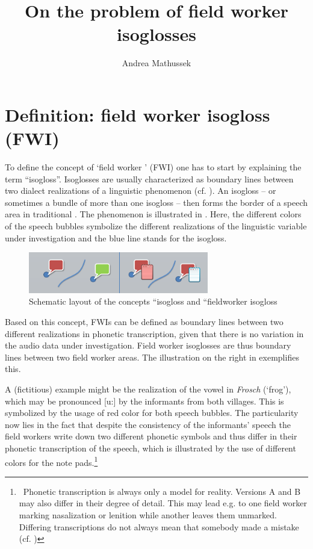 \documentclass[output=paper]{LSP/langsci}
\author{Andrea Mathussek\affiliation{University of Freiburg}}
\title{On the problem of field worker isoglosses}
\begin{document}
\section{Definition: field worker isogloss (FWI)}
To define the concept of `field worker ' (FWI) one has to start by explaining the term ``isogloss''. Isoglosses are usually characterized as boundary lines between two dialect realizations of a linguistic phenomenon (cf. \citealt[296--297]{gluck_metzler_2005}). An isogloss – or sometimes a bundle of more than one isogloss – then forms the border of a speech area in traditional . The phenomenon is illustrated in . Here, the different colors of the speech bubbles symbolize the different realizations of the linguistic variable under investigation and the blue line stands for the isogloss.

\begin{figure}
\includegraphics[width=0.7\textwidth]{illustrations/mathus_fig1}
\caption{Schematic layout of the concepts ``isogloss{\textquotedbl} and ``fieldworker isogloss{\textquotedbl}}
\label{fig:mathus:1}
\end{figure}

Based on this concept, FWIs can be defined as boundary lines between two different realizations in phonetic transcription, given that there is no variation in the audio data under investigation. Field worker isoglosses are thus boundary lines between two field worker areas. The illustration on the right in  exemplifies this.

A (fictitious) example might be the realization of the vowel in \textit{Frosch} (`frog'), which may be pronounced [u:] by the informants from both villages. This is symbolized by the usage of red color for both speech bubbles. The particularity now lies in the fact that despite the consistency of the informants' speech the field workers write down two different phonetic symbols and thus differ in their phonetic transcription of the speech, which is illustrated by the use of different colors for the note pads.\footnote{\ Phonetic transcription is always only a model for reality. Versions A and B may also differ in their degree of detail. This may lead e.g. to one field worker marking nasalization or lenition while another leaves them unmarked. Differing transcriptions do not always mean that somebody made a mistake (cf. \citealt[41--69]{mathussek_sprachraume_2014})} 
\end{document}
